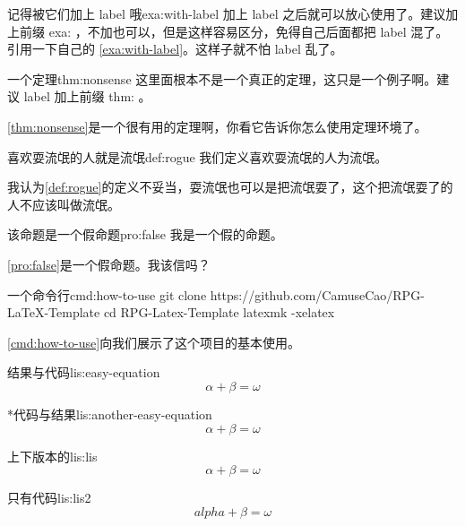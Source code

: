 \documentclass[bibstyle=super,font=empty]{Muse-Book}
\begin{document}
\begin{muse-example}{记得被它们加上 label 哦}{exa:with-label}
	加上 label 之后就可以放心使用了。建议加上前缀 exa: ，不加也可以，但是这样容易区分，免得自己后面都把 label 混了。引用一下自己的 \cref{exa:with-label}。这样子就不怕 label 乱了。
\end{muse-example}

\begin{muse-theorem}{一个定理}{thm:nonsense}
	这里面根本不是一个真正的定理，这只是一个例子啊。建议 label 加上前缀 thm: 。
\end{muse-theorem}
\cref{thm:nonsense}是一个很有用的定理啊，你看它告诉你怎么使用定理环境了。

\begin{muse-definition}{喜欢耍流氓的人就是流氓}{def:rogue}
	我们定义喜欢耍流氓的人为流氓。
\end{muse-definition}
我认为\cref{def:rogue}的定义不妥当，耍流氓也可以是把流氓耍了，这个把流氓耍了的人不应该叫做流氓。

\begin{muse-proposition}{该命题是一个假命题}{pro:false}
	我是一个假的命题。
\end{muse-proposition}
\cref{pro:false}是一个假命题。我该信吗？

\begin{muse-cmd}[Camuse]{一个命令行}{cmd:how-to-use}
git clone https://github.com/CamuseCao/RPG-LaTeX-Template
cd RPG-Latex-Template
latexmk -xelatex
\end{muse-cmd}
\cref{cmd:how-to-use}向我们展示了这个项目的基本使用。

\begin{muse-listing}{结果与代码}{lis:easy-equation}
\begin{equation}
  \alpha + \beta = \omega 
\end{equation}
\end{muse-listing}


\begin{muse-listing}*{代码与结果}{lis:another-easy-equation}
\begin{equation}
  \alpha + \beta = \omega 
\end{equation}
\end{muse-listing}

\begin{muse-hlisting}{上下版本的}{lis:lis}
\begin{equation}
  \alpha + \beta = \omega 
\end{equation}
\end{muse-hlisting}

\begin{muse-hlisting}{只有代码}{lis:lis2}
\begin{equation}
  alpha + \beta = \omega 
\end{equation}
\end{muse-hlisting}
\end{document}
